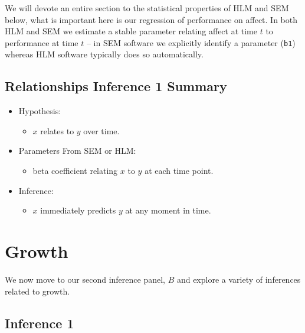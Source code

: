 \documentclass[english,,man]{apa6}
\providecommand{\tightlist}{%
  \setlength{\itemsep}{0pt}\setlength{\parskip}{0pt}}
\theoremstyle{definition}
\theoremstyle{definition}
\theoremstyle{definition}
\theoremstyle{remark}
\begin{document}
We will devote an entire section to the statistical properties of HLM
and SEM below, what is important here is our regression of performance
on affect. In both HLM and SEM we estimate a stable parameter relating
affect at time \(t\) to performance at time \(t\) -- in SEM software we
explicitly identify a parameter (\texttt{b1}) whereas HLM software
typically does so automatically.

\hypertarget{relationships-inference-1-summary}{%
\subsection{Relationships Inference 1
Summary}\label{relationships-inference-1-summary}}

\begin{itemize}
\item
  Hypothesis:

  \begin{itemize}
  \tightlist
  \item
    \(x\) relates to \(y\) over time.
  \end{itemize}
\item
  Parameters From SEM or HLM:

  \begin{itemize}
  \tightlist
  \item
    beta coefficient relating \(x\) to \(y\) at each time point.
  \end{itemize}
\item
  Inference:

  \begin{itemize}
  \tightlist
  \item
    \(x\) immediately predicts \(y\) at any moment in time.
  \end{itemize}
\end{itemize}

\hypertarget{growth}{%
\section{Growth}\label{growth}}

We now move to our second inference panel, \(B\) and explore a variety
of inferences related to growth.

\hypertarget{inference-1-1}{%
\subsection{Inference 1}\label{inference-1-1}}
\end{document}

